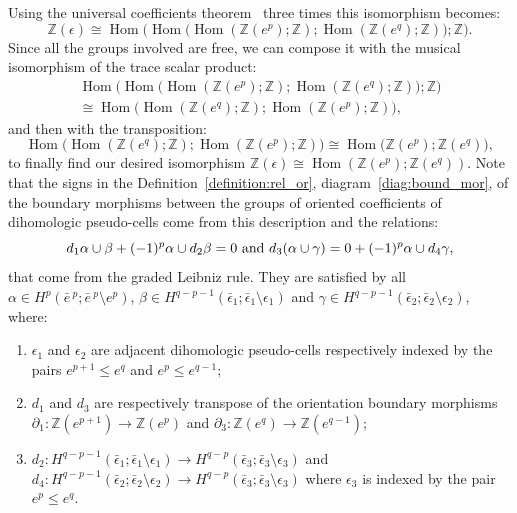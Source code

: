 \documentclass[AHL,Unicode,longabstracts,published]{cedram}
\newcommand{\Z}{\mathbb{Z}}
\DeclareMathOperator{\Hom}{Hom}
\begin{document}
Using the universal coefficients theorem~\cite[Theorem~3.3 p.~113]{Car-Eil_hom_alg}
three times this isomorphism becomes:
\begin{equation*}
\Z(\epsilon) \cong \Hom\Big(\Hom\Big(\Hom(\Z(e^p);\Z);\Hom(\Z(e^q);\Z)\Big);\Z\Big).
\end{equation*}
Since all the groups involved are free, we can compose it with the musical isomorphism of the trace scalar product:
\begin{multline*}
\Hom\Big(\Hom\Big(\Hom(\Z(e^p);\Z);\Hom(\Z(e^q);\Z)\Big);\Z\Big)\\
\cong \Hom\Big(\Hom(\Z(e^q);\Z);\Hom(\Z(e^p);\Z)\Big),
\end{multline*}
and then with the transposition:
\begin{equation*}
\Hom\Big(\Hom(\Z(e^q);\Z);\Hom(\Z(e^p);\Z)\Big) \cong \Hom\Big(\Z(e^p);\Z(e^q)\Big),
\end{equation*}
to finally find our desired isomorphism $\Z(\epsilon)\cong\Hom(\Z(e^p);\Z(e^q))$. Note that the signs in the Definition~\ref{definition:rel_or}, diagram~\eqref{diag:bound_mor}, of the boundary morphisms between the groups of oriented coefficients of dihomologic pseudo-cells come from this description and the relations:
\begin{equation*}
d_1\alpha\cup\beta+(-1)^p\alpha\cup d_2\beta = 0 \textnormal{ and } d_3(\alpha\cup \gamma)=0+(-1)^p\alpha\cup d_4\gamma,
\end{equation*}
that come from the graded Leibniz rule. They are satisfied by all $\alpha\in H^p(\bar{e}\,^p;\bar{e}\,^p\setminus e^p)$, $\beta\in H^{q-p-1}(\bar{\epsilon}_1;\bar{\epsilon}_1\setminus\epsilon_1)$ and $\gamma\in H^{q-p-1}(\bar{\epsilon}_2;\bar{\epsilon}_2\setminus\epsilon_2)$, where:
\begin{enumerate}
\item $\epsilon_1$ and $\epsilon_2$ are adjacent dihomologic pseudo-cells respectively indexed by the pairs $e^{p+1}\leq e^q$ and $e^p\leq e^{q-1}$;
\item $d_1$ and $d_3$ are respectively transpose of the orientation boundary morphisms $\partial_1:\Z(e^{p+1})\rightarrow\Z(e^p)$ and ${\partial_3:\Z(e^{q})\rightarrow\Z(e^{q-1})}$;
\item $d_2:H^{q-p-1}(\bar{\epsilon}_1;\bar{\epsilon}_1\setminus\epsilon_1)\rightarrow H^{q-p}(\bar{\epsilon}_3;\bar{\epsilon}_3\setminus\epsilon_3)$ and $d_4:H^{q-p-1}(\bar{\epsilon}_2;\bar{\epsilon}_2\setminus\epsilon_2)\rightarrow H^{q-p}(\bar{\epsilon}_3;\bar{\epsilon}_3\setminus\epsilon_3)$ where $\epsilon_3$ is indexed by the pair $e^p\leq e^q$.
\end{enumerate}
\end{document}
